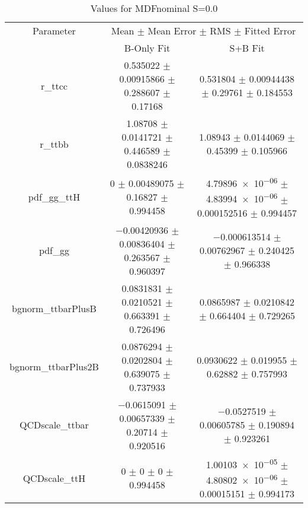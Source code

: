 \begin{table}
\centering
\caption{Values for MDFnominal S=0.0}
\begin{tabular}{ccc}
\toprule
Parameter & \multicolumn{2}{c}{Mean $\pm$ Mean Error $\pm$ RMS $\pm$ Fitted Error}\\
 & B-Only Fit & S+B Fit\\
\midrule
r\_ttcc & \num{0.535022} $\pm$ \num{0.00915866} $\pm$ \num{0.288607} $\pm$ \num{0.17168} & \num{0.531804} $\pm$ \num{0.00944438} $\pm$ \num{0.29761} $\pm$ \num{0.184553}\\
r\_ttbb & \num{1.08708} $\pm$ \num{0.0141721} $\pm$ \num{0.446589} $\pm$ \num{0.0838246} & \num{1.08943} $\pm$ \num{0.0144069} $\pm$ \num{0.45399} $\pm$ \num{0.105966}\\
pdf\_gg\_ttH & \num{0} $\pm$ \num{0.00489075} $\pm$ \num{0.16827} $\pm$ \num{0.994458} & \num{4.79896e-06} $\pm$ \num{4.83994e-06} $\pm$ \num{0.000152516} $\pm$ \num{0.994457}\\
pdf\_gg & \num{-0.00420936} $\pm$ \num{0.00836404} $\pm$ \num{0.263567} $\pm$ \num{0.960397} & \num{-0.000613514} $\pm$ \num{0.00762967} $\pm$ \num{0.240425} $\pm$ \num{0.966338}\\
bgnorm\_ttbarPlusB & \num{0.0831831} $\pm$ \num{0.0210521} $\pm$ \num{0.663391} $\pm$ \num{0.726496} & \num{0.0865987} $\pm$ \num{0.0210842} $\pm$ \num{0.664404} $\pm$ \num{0.729265}\\
bgnorm\_ttbarPlus2B & \num{0.0876294} $\pm$ \num{0.0202804} $\pm$ \num{0.639075} $\pm$ \num{0.737933} & \num{0.0930622} $\pm$ \num{0.019955} $\pm$ \num{0.62882} $\pm$ \num{0.757993}\\
QCDscale\_ttbar & \num{-0.0615091} $\pm$ \num{0.00657339} $\pm$ \num{0.20714} $\pm$ \num{0.920516} & \num{-0.0527519} $\pm$ \num{0.00605785} $\pm$ \num{0.190894} $\pm$ \num{0.923261}\\
QCDscale\_ttH & \num{0} $\pm$ \num{0} $\pm$ \num{0} $\pm$ \num{0.994458} & \num{1.00103e-05} $\pm$ \num{4.80802e-06} $\pm$ \num{0.00015151} $\pm$ \num{0.994173}\\
\bottomrule
\end{tabular}
\end{table}